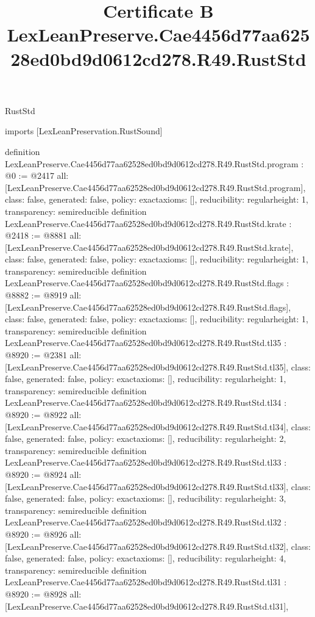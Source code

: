 \begin{lexlean}{RustStd}
\title{Certificate B LexLeanPreserve.Cae4456d77aa62528ed0bd9d0612cd278.R49.RustStd}
\begin{coremodule}
imports [LexLeanPreservation.RustSound]

definition LexLeanPreserve.Cae4456d77aa62528ed0bd9d0612cd278.R49.RustStd.program : @0 := @2417 {
  all: [LexLeanPreserve.Cae4456d77aa62528ed0bd9d0612cd278.R49.RustStd.program],
  class: false,
  generated: false,
  policy: exact{axioms: []},
  reducibility: regular{height: 1},
  transparency: semireducible
}
definition LexLeanPreserve.Cae4456d77aa62528ed0bd9d0612cd278.R49.RustStd.krate : @2418 := @8881 {
  all: [LexLeanPreserve.Cae4456d77aa62528ed0bd9d0612cd278.R49.RustStd.krate],
  class: false,
  generated: false,
  policy: exact{axioms: []},
  reducibility: regular{height: 1},
  transparency: semireducible
}
definition LexLeanPreserve.Cae4456d77aa62528ed0bd9d0612cd278.R49.RustStd.flags : @8882 := @8919 {
  all: [LexLeanPreserve.Cae4456d77aa62528ed0bd9d0612cd278.R49.RustStd.flags],
  class: false,
  generated: false,
  policy: exact{axioms: []},
  reducibility: regular{height: 1},
  transparency: semireducible
}
definition LexLeanPreserve.Cae4456d77aa62528ed0bd9d0612cd278.R49.RustStd.tl35 : @8920 := @2381 {
  all: [LexLeanPreserve.Cae4456d77aa62528ed0bd9d0612cd278.R49.RustStd.tl35],
  class: false,
  generated: false,
  policy: exact{axioms: []},
  reducibility: regular{height: 1},
  transparency: semireducible
}
definition LexLeanPreserve.Cae4456d77aa62528ed0bd9d0612cd278.R49.RustStd.tl34 : @8920 := @8922 {
  all: [LexLeanPreserve.Cae4456d77aa62528ed0bd9d0612cd278.R49.RustStd.tl34],
  class: false,
  generated: false,
  policy: exact{axioms: []},
  reducibility: regular{height: 2},
  transparency: semireducible
}
definition LexLeanPreserve.Cae4456d77aa62528ed0bd9d0612cd278.R49.RustStd.tl33 : @8920 := @8924 {
  all: [LexLeanPreserve.Cae4456d77aa62528ed0bd9d0612cd278.R49.RustStd.tl33],
  class: false,
  generated: false,
  policy: exact{axioms: []},
  reducibility: regular{height: 3},
  transparency: semireducible
}
definition LexLeanPreserve.Cae4456d77aa62528ed0bd9d0612cd278.R49.RustStd.tl32 : @8920 := @8926 {
  all: [LexLeanPreserve.Cae4456d77aa62528ed0bd9d0612cd278.R49.RustStd.tl32],
  class: false,
  generated: false,
  policy: exact{axioms: []},
  reducibility: regular{height: 4},
  transparency: semireducible
}
definition LexLeanPreserve.Cae4456d77aa62528ed0bd9d0612cd278.R49.RustStd.tl31 : @8920 := @8928 {
  all: [LexLeanPreserve.Cae4456d77aa62528ed0bd9d0612cd278.R49.RustStd.tl31],
}
\end{coremodule}
\end{lexlean}

